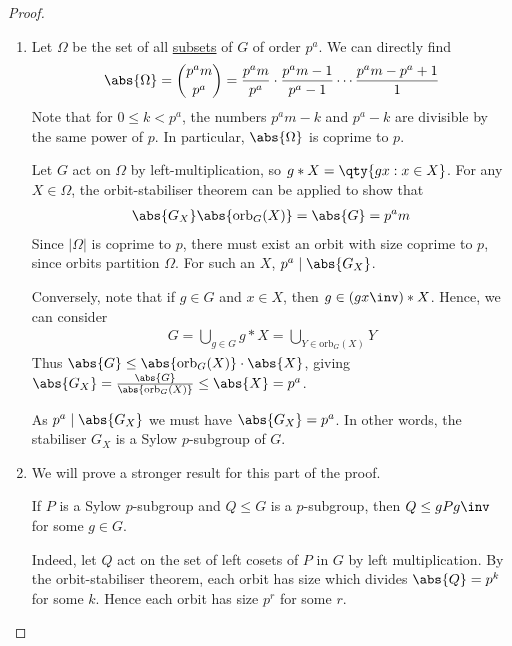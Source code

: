 \begin{proof}
	\begin{enumerate}
		\item Let $\Omega$ be the set of all \underline{subsets} of $G$ of order $p^a$.
		      We can directly find
		      \begin{align*}
			      \abs{\Omega} = \binom{p^a m}{p^a} = \frac{p^a m}{p^a} \cdot \frac{p^a m - 1}{p^a - 1} \cdots \frac{p^a m - p^a + 1}{1}
		      \end{align*}
		      Note that for $0 \leq k < p^a$, the numbers $p^a m - k$ and $p^a - k$ are divisible by the same power of $p$.
		      In particular, $\abs{\Omega}$ is coprime to $p$.

		      Let $G$ act on $\Omega$ by left-multiplication, so $g \ast X = \qty{gx : x \in X}$.
		      For any $X \in \Omega$, the orbit-stabiliser theorem can be applied to show that
		      \begin{align*}
			      \abs{G_X} \abs{\mathrm{orb}_G(X)} = \abs{G} = p^a m
		      \end{align*}
		      Since $|\Omega|$ is coprime to $p$, there must exist an orbit with size coprime to $p$, since orbits partition $\Omega$.
		      For such an $X$, $p^a \mid \abs{G_X}$.

		      Conversely, note that if $g \in G$ and $x \in X$, then $g \in (gx\inv) \ast X$.
		      Hence, we can consider
		      \begin{align*}
			      G = \bigcup_{g \in G} g \ast X = \bigcup_{Y \in \mathrm{orb}_G(X)} Y
		      \end{align*}
		      Thus $\abs{G} \leq \abs{\mathrm{orb}_G(X)} \cdot \abs{X}$, giving $\abs{G_X} = \frac{\abs{G}}{\abs{\mathrm{orb}_G(X)}} \leq \abs{X} = p^a$.

		      As $p^a \mid \abs{G_X}$ we must have $\abs{G_X} = p^a$.
		      In other words, the stabiliser $G_X$ is a Sylow $p$-subgroup of $G$.
		\item We will prove a stronger result for this part of the proof.
		      \begin{lemma} \label{lem:4.7}
				If $P$ is a Sylow $p$-subgroup and $Q \leq G$ is a $p$-subgroup, then $Q \leq g P g\inv$ for some $g \in G$.
			  \end{lemma} 

		      Indeed, let $Q$ act on the set of left cosets of $P$ in $G$ by left multiplication.
		      By the orbit-stabiliser theorem, each orbit has size which divides $\abs{Q} = p^k$ for some $k$.
		      Hence each orbit has size $p^r$ for some $r$.


\end{enumerate}
\end{proof}
